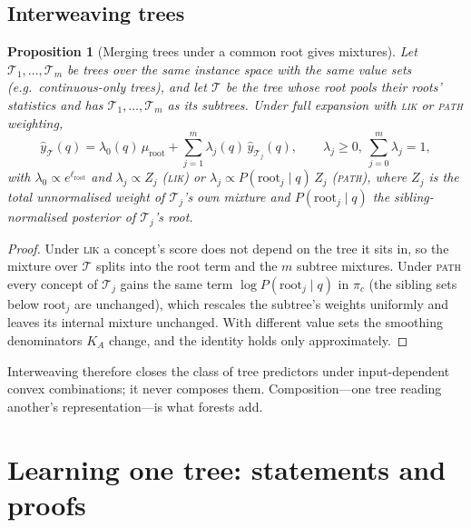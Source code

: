 \documentclass[11pt]{article}
\newtheorem{proposition}[theorem]{Proposition}
\theoremstyle{definition}
\theoremstyle{remark}
\newcommand{\T}{\mathcal{T}}
\newcommand{\hy}{\hat{y}}
\begin{document}
\subsection{Interweaving trees}

\begin{proposition}[Merging trees under a common root gives mixtures]\label{prop:interweave}
Let $\T_1,\dots,\T_m$ be trees over the same instance space with the same value sets
(e.g.\ continuous-only trees), and let $\T$ be the tree whose root pools their roots'
statistics and has $\T_1,\dots,\T_m$ as its subtrees.  Under full expansion with
\textsc{lik} or \textsc{path} weighting,
\[
  \hy_\T(q)=\lambda_0(q)\,\mu_{\text{root}}+\sum_{j=1}^m\lambda_j(q)\,\hy_{\T_j}(q),
  \qquad\lambda_j\ge0,\ \sum_{j=0}^m\lambda_j=1,
\]
with $\lambda_0\propto e^{\ell_{\text{root}}}$ and $\lambda_j\propto Z_j$ (\textsc{lik})
or $\lambda_j\propto P(\text{root}_j\mid q)\,Z_j$ (\textsc{path}), where $Z_j$ is the
total unnormalised weight of $\T_j$'s own mixture and $P(\text{root}_j\mid q)$ the
sibling-normalised posterior of $\T_j$'s root.
\end{proposition}
\begin{proof}
Under \textsc{lik} a concept's score does not depend on the tree it sits in, so the
mixture over $\T$ splits into the root term and the $m$ subtree mixtures.  Under
\textsc{path} every concept of $\T_j$ gains the same term $\log P(\text{root}_j\mid q)$
in $\pi_c$ (the sibling sets below $\text{root}_j$ are unchanged), which rescales the
subtree's weights uniformly and leaves its internal mixture unchanged.  With different
value sets the smoothing denominators $K_A$ change, and the identity holds only
approximately.
\end{proof}

Interweaving therefore closes the class of tree predictors under input-dependent
convex combinations; it never composes them.  Composition---one tree reading another's
representation---is what forests add.

\section{Learning one tree: statements and proofs}\label{sec:learn}
\end{document}
